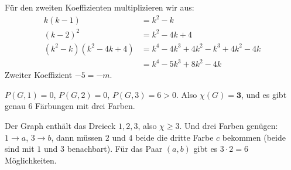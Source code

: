 \begin{aufgabe}
Für den zweiten Koeffizienten multiplizieren wir aus:
\begin{align*}
k(k-1) &= k^2-k\\
(k-2)^2 &= k^2-4k+4\\
(k^2-k)(k^2-4k+4) &= k^4 - 4k^3 + 4k^2 - k^3 + 4k^2 - 4k\\
&= k^4 - 5k^3 + 8k^2 - 4k
\end{align*}
Zweiter Koeffizient $-5 = -m$. \checkmark

$P(G,1) = 0$, $P(G,2) = 0$, $P(G,3) = 6 > 0$. Also $\chi(G) = \mathbf{3}$, und es gibt genau $6$ Färbungen mit drei Farben.

Der Graph enthält das Dreieck $1,2,3$, also $\chi \ge 3$. Und drei Farben genügen: $1 \to a$, $3 \to b$, dann müssen $2$ und $4$ beide die dritte Farbe $c$ bekommen (beide sind mit $1$ und $3$ benachbart). Für das Paar $(a,b)$ gibt es $3 \cdot 2 = 6$ Möglichkeiten. \checkmark
\end{aufgabe}

